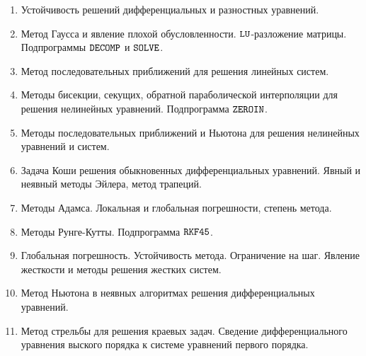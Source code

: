 \documentclass[a4paper,11pt]{article}
\begin{document}
\begin{enumerate}
    \item Устойчивость решений дифференциальных и разностных уравнений.
    \item Метод Гаусса и явление плохой обусловленности. $\verb|LU|$-разложение матрицы.
                Подпрограммы $\verb|DECOMP|$ и $\verb|SOLVE|$.
    \item Метод последовательных приближений для решения линейных систем.
    \item Методы бисекции, секущих, обратной параболической интерполяции для решения нелинейных уравнений. Подпрограмма $\verb|ZEROIN|$.
    \item Методы последовательных приближений и Ньютона для решения нелинейных уравнений и систем.
    \item Задача Коши решения обыкновенных дифференциальных уравнений. Явный и неявный методы Эйлера, метод трапеций.
    \item Методы Адамса. Локальная и глобальная погрешности, степень метода.
    \item Методы Рунге-Кутты. Подпрограмма $\verb|RKF45|$.
    \item Глобальная погрешность. Устойчивость метода. Ограничение на шаг.
                Явление жесткости и методы решения жестких систем.
    \item Метод Ньютона в неявных алгоритмах решения дифференциальных уравнений.
    \item Метод стрельбы для решения краевых задач. Сведение дифференциального уравнения выского порядка к системе уравнений первого порядка.
\end{enumerate}
\end{document}
